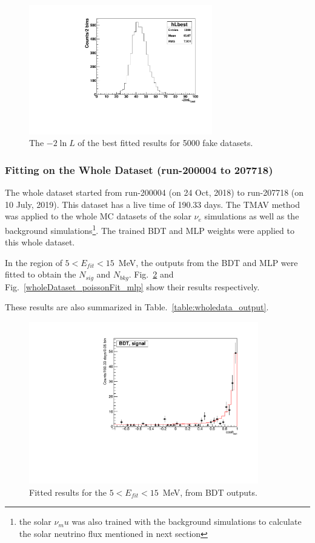 \begin{figure}[!htb]
	\centering
	\includegraphics[width=8cm]{ensemble_lnLbest.pdf}
	\caption{The $-2\ln L$ of the best fitted results for 5000 fake datasets.}
	\label{poisson_fitLnL}
\end{figure}

\subsubsection{Fitting on the Whole Dataset (run-200004 to 207718)}
The whole dataset started from run-200004 (on 24 Oct, 2018) to run-207718 (on 10 July, 2019). This dataset has a live time of 190.33 days. The TMAV method was applied to the whole MC datasets of the solar $\nu_e$ simulations as well as the background simulations\footnote{the solar $\nu_mu$ was also trained with the background simulations to calculate the solar neutrino flux mentioned in next section}. The trained BDT and MLP weights were applied to this whole dataset.

In the region of $5<E_{fit}<15$~MeV, the outputs from the BDT and MLP were fitted to obtain the $N_{sig}$ and $N_{bkg}$. Fig.~\ref{wholeDataset_poissonFit_bdt} and Fig.~\ref{wholeDataset_poissonFit_mlp} show their results respectively.

These results are also summarized in Table.~\ref{table:wholedata_output}.

\begin{figure}[!htb]
	\centering
	\includegraphics[width=10cm]{wholedataFit_bdt.pdf}
	\caption{Fitted results for the $5<E_{fit}<15$~MeV, from BDT outputs.} \label{wholeDataset_poissonFit_bdt}
\end{figure} 

